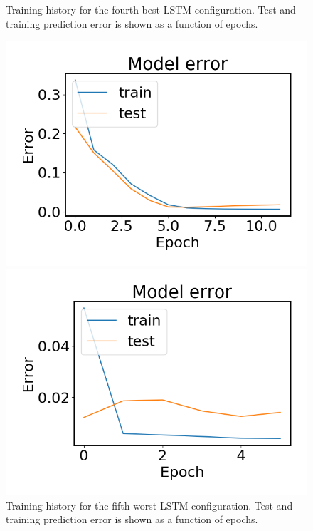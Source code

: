 \begin{figure}
\begin{minipage}[b]{0.49\linewidth}
            \caption{Training history for the fourth best LSTM configuration. Test and training prediction error is shown as a function of epochs.}
        \end{minipage}
    \end{figure}

    \begin{figure}
        \begin{minipage}[b]{0.49\linewidth}
            \centering
            \includegraphics[width = \textwidth]{report/figures/analysis/lstm_gridsearch/worst_lstm_error_-5.png}
            \caption{Training history for the fifth worst LSTM configuration. Test and training prediction error is shown as a function of epochs.}
        \end{minipage}
        \hfill\vline\hfill
        \begin{minipage}[b]{0.49\linewidth}
            \centering
            \includegraphics[width = \textwidth]{report/figures/analysis/lstm_gridsearch/worst_lstm_error_-4.png}

\end{minipage}
\end{figure}

